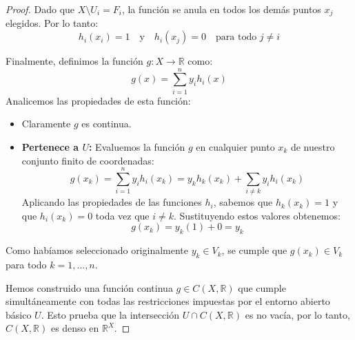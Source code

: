 \documentclass{article}
\theoremstyle{plain}
\theoremstyle{definition}
\newcommand{\R}{\mathbb{R}}
\begin{document}
\begin{proof}
    Dado que \(X \setminus U_i = F_i\), la función se anula en todos los demás puntos \( x_j \) elegidos. Por lo tanto:
    \[
        h_i(x_i) = 1 \quad \text{y} \quad h_i(x_j) = 0 \quad \text{para todo } j \neq i
    \]

    Finalmente, definimos la función \( g: X \to \R \) como:
    \[
        g(x) = \sum_{i=1}^{n} y_i h_i(x)
    \]
    Analicemos las propiedades de esta función:
    \begin{itemize}
        \item Claramente \( g \) es continua.
        \item \textbf{Pertenece a \(U\):} Evaluemos la función \(g\) en cualquier punto \(x_k\) de nuestro conjunto finito de coordenadas:
              \[
                  g(x_k) = \sum_{i=1}^{n} y_i h_i(x_k) = y_k h_k(x_k) + \sum_{i \neq k} y_i h_i(x_k)
              \]
              Aplicando las propiedades de las funciones \(h_i\), sabemos que \(h_k(x_k) = 1\) y que \(h_i(x_k) = 0\) toda vez que \(i \neq k\). Sustituyendo estos valores obtenemos:
              \[
                  g(x_k) = y_k(1) + 0 = y_k
              \]
    \end{itemize}
    Como habíamos seleccionado originalmente \(y_k \in V_k\), se cumple que \(g(x_k) \in V_k\) para todo \(k = 1, \dots, n\).

    Hemos construido una función continua \(g \in C(X, \mathbb{R})\) que cumple simultáneamente con todas las restricciones impuestas por el entorno abierto básico \(U\). Esto prueba que la intersección \(U \cap C(X, \mathbb{R})\) es no vacía, por lo tanto, \(C(X, \R)\) es denso en \(\R^X\).
\end{proof}
\end{document}

